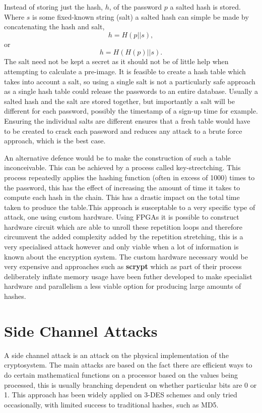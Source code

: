 \documentclass[a4paper,12pt]{article}
\begin{document}
Instead of storing just the hash, $h$, of the password $p$ a salted hash is stored. Where $s$ is some fixed-known string (salt) a salted hash can simple be made by concatenating the hash and salt, $$h = H(p||s),$$ or $$h = H(H(p) || s).$$
The salt need not be kept a secret as it should not be of little help when attempting to calculate a pre-image. It is feasible to create a hash table which takes into account a salt, so using a single salt is not a particularly safe approach as a single hash table could release the passwords to an entire database. Usually a salted hash and the salt are stored together, but importantly a salt will be different for each password, possibly the timestamp of a sign-up time for example. Ensuring the individual salts are different ensures that a fresh table would have to be created to crack each password and reduces any attack to a brute force approach, which is the best case.

An alternative defence would be to make the construction of such a table inconceivable. This can be achieved by a process called key-strectching. This process repeatedly applies the hashing function (often in excess of 1000) times to the password, this has the effect of increasing the amount of time it takes to compute each hash in the chain. This has a drastic impact on the total time taken to produce the table.This approach is susceptable to a very specific type of attack, one using custom hardware. 
Using FPGAs it is possible to construct hardware circuit which are able to unroll these repetition loops and therefore circumvent the added complexity added by the repetition stretching, this is a very specialised attack however and only viable when a lot of information is known about the encryption system. The custom hardware necessary would be very expensive and approaches such as \textbf{scrypt}\cite{colin} which as part of their process deliberately inflate memory usage have been futher developed to make specialist hardware and parallelism a less viable option for producing large amounts of hashes.



\section{Side Channel Attacks}
A side channel attack is an attack on the physical implementation of the cryptosystem. The main attacks are based on the fact there are efficient ways to do certain mathematical functions on a processor based on the values being processed, this is usually branching dependent on whether particular bits are 0 or 1. This approach has been widely applied on 3-DES schemes and only tried occasionally, with limited success to traditional hashes, such as MD5.
\end{document}
